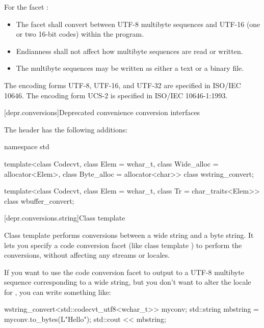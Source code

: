 \pnum
For the facet :
\begin{itemize}
\item
  The facet shall convert between UTF-8 multibyte sequences
  and UTF-16 (one or two 16-bit codes) within the program.
\item
  Endianness shall not affect how multibyte sequences are read or written.
\item
  The multibyte sequences may be written as either a text or a binary file.
\end{itemize}

\pnum
The encoding forms UTF-8, UTF-16, and UTF-32 are specified in ISO/IEC 10646.
The encoding form UCS-2 is specified in ISO/IEC 10646-1:1993.

[depr.conversions]{Deprecated convenience conversion interfaces}

\pnum
The header  has the following additions:

\begin{codeblock}
namespace std {
  template<class Codecvt, class Elem = wchar_t,
           class Wide_alloc = allocator<Elem>,
           class Byte_alloc = allocator<char>>
    class wstring_convert;

  template<class Codecvt, class Elem = wchar_t,
           class Tr = char_traits<Elem>>
    class wbuffer_convert;
}
\end{codeblock}

[depr.conversions.string]{Class template }

\pnum
Class template  performs conversions between a wide
string and a byte string. It lets you specify a code conversion facet
(like class template ) to perform the conversions, without
affecting any streams or locales.
\begin{example}
If you want to use the code
conversion facet  to output to  a UTF-8
multibyte sequence corresponding to a wide string, but you don't want to
alter the locale for , you can write something like:
\begin{codeblock}
wstring_convert<std::codecvt_utf8<wchar_t>> myconv;
std::string mbstring = myconv.to_bytes(L"Hello\n");
std::cout << mbstring;
\end{codeblock}
\end{example}

